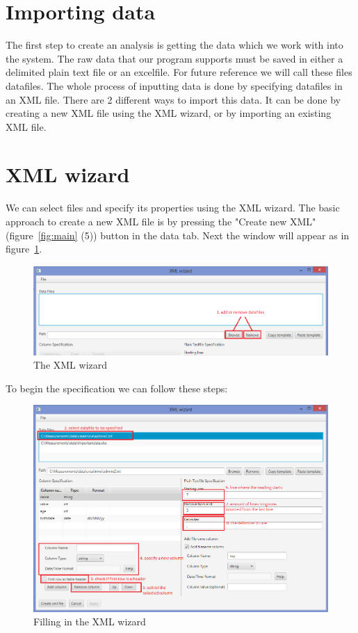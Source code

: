\documentclass[a4paper]{article}
\begin{document}
\section{Importing data}
The first step to create an analysis is getting the data which we work with into the system. The raw data that our program supports must be saved in either a delimited plain text file or an excelfile. For future reference we will call these files datafiles. The whole process of inputting data is done by specifying datafiles in an XML file. There are 2 different ways to import this data. It can be done by creating a new XML file using the XML wizard, or by importing an existing XML file.

\section{XML wizard}
We can select files and specify its properties using the XML wizard. The basic approach to create a new XML file is by pressing the "Create new XML" (figure~\ref{fig:main} (5)) button in the data tab. Next the window will appear as in figure~\ref{fig:xmlwizard}.

\begin{figure}[h]
	\centering
	\includegraphics[scale=0.5]{xmlwizard.png}
 	\caption{The XML wizard}
	\label{fig:xmlwizard}
\end{figure}

To begin the specification we can follow these steps:

\begin{figure}[h]
	\centering
	\includegraphics[scale=0.5]{xmlwizardfilled.png}
 	\caption{Filling in the XML wizard}
	\label{fig:xmlwizardfilled}
\end{figure}
\end{document}
